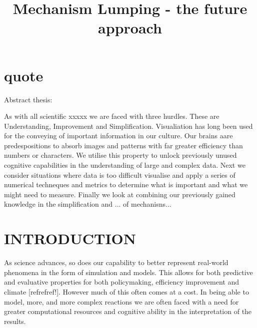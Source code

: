 \documentclass{pasa}%
\title{Mechanism Lumping - the future approach}
\begin{document}
%
%
%
\onecolumn
\linespread{1.5}

\section{quote}

Abstract thesis: 

As with all scientific xxxxx we are faced with three hurdles. These are Understanding, Improvement and Simplification. Visualiation has long been used for the conveying of important information in our culture. Our brains aare predespositions to absorb images and patterns with far greater efficiency than numbers or characters. We utilise this property to unlock previously unused cognitive capabilities in the understanding of large and complex data. 
Next we consider situations where data is too difficult visualise and apply a series of numerical techneques and metrics to determine what is important and what we might need to measure. 
Finally we look at combining our previously gained knowledge in the simplification and ... of mechanisns... 

\section{INTRODUCTION }


\label{sec:intro}
 
 As science advances, so does our capability to better represent real-world phenomena in the form of simulation and models. This allows for both predictive and evaluative properties for both policymaking, efficiency improvement and climate [refrefref!]. However much of this often comes at a cost. In being able to model, more, and more complex reactions we are often faced with a need for greater computational resources and cognitive ability in the interpretation of the results. \\
 
\end{document}

